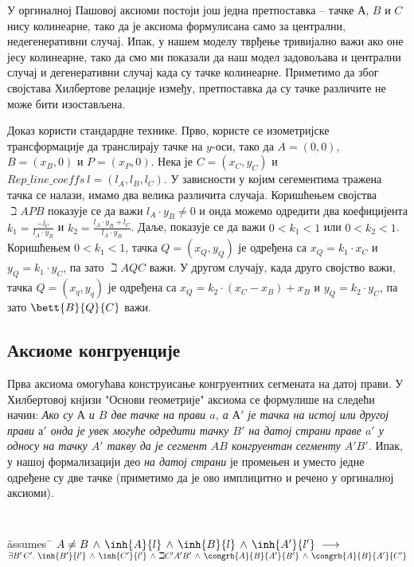 \begin{center}

\end{center}

У оргиналној Пашовој аксиоми постоји још једна претпоставка -- тачке
$А$, $B$ и $C$ нису колинеарне, тако да је аксиома формулисана само за
централни, недегенеративни случај. Ипак, у нашем моделу тврђење
тривијално важи ако оне јесу колинеарне, тако да смо ми показали да
наш модел задовољава и централни случај и дегенеративни случај када су
тачке колинеарне. Приметимо да због својстава Хилбертове релације
између, претпоставка да су тачке различите не може бити изостављена.

Доказ користи стандардне технике. Прво, користе се изометријске
трансформације да транслирају тачке на $y$-оси, тако да $A = (0, 0)$,
$B = (x_B, 0)$ и $P = (x_P, 0)$. Нека је $C = (x_C, y_C)$ и
$\mathit{Rep\_line\_coeffs}\ l = (l_A, l_B, l_C)$. У зависности у
којим сегементима тражена тачка се налази, имамо два велика различита
случаја. Коришћењем својства $\beth{A}{P}{B}$ показује се да важи
$l_A\cdot y_B \neq 0$ и онда можемо одредити два коефицијента $k_1 =
\frac{-l_C}{l_A\cdot y_B}$ и $k_2 = \frac{l_A\cdot y_B + l_C}{l_A\cdot
  y_B}$.  Даље, показује се да важи $0 < k_1 < 1$ или $0 < k_2 <
1$. Коришћењем $0 < k_1 < 1$, тачка $Q = (x_Q, y_Q)$ је одређена са
$x_Q = k_1\cdot x_C$ и $y_Q = k_1\cdot y_C$, па зато $\beth{A}{Q}{C}$
важи. У другом случају, када друго својство важи, тачка $Q=(x_q, y_q)$
је одређена са $x_Q = k_2\cdot (x_C - x_B) + x_B$ и $y_Q = k_2\cdot
y_C$, па зато $\bett{B}{Q}{C}$ важи.

\subsection{Аксиоме конгруенције}
Прва аксиома омогућава конструисање конгруентних сегмената на датој
прави. У Хилбертовој кнјизи "Основи геометрије" \cite{hilbert} аксиома
се формулише на следећи начин: \emph{Ако су $А$ и $B$ две тачке на
  прави $a$, а $А'$ је тачка на истој или другој прави $а'$ онда је
  увек могуће одредити тачку $B'$ на датој страни праве $a'$ у односу
  на тачку $A'$ такву да је сегмент $AB$ конгруентан сегменту $A'B'$.}
Ипак, у нашој формализацији део \emph{на датој страни} је промењен и
уместо једне одређене су две тачке (приметимо да је ово имплицитно и
речено у оргиналној аксиоми).

{\tt
\begin{tabbing}
\hspace{5mm}\=assumes\ \=\kill
$A \neq B\,\wedge\,\inh{A}{l}\,\wedge\,\inh{B}{l}\,\wedge\,\inh{A'}{l'}\ \longrightarrow$\\
\> $\exists B'\, C'.\ \inh{B'}{l'}\,\wedge\,\inh{C'}{l'}\,\wedge\,\beth{C'}{A'}{B'}\,\wedge\,\congrh{A}{B}{A'}{B'}\,\wedge\,\congrh{A}{B}{A'}{C'}$
\end{tabbing}
}

